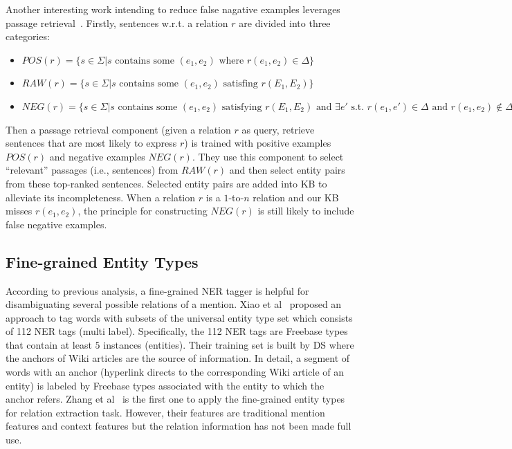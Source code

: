 \documentclass[10pt]{article} %
\theoremstyle{definition}
\theoremstyle{definition}
\begin{document}
Another interesting work intending to reduce false nagative examples leverages passage retrieval~\cite{passageretrieval}. 
Firstly, sentences w.r.t. a relation $r$ are divided into three categories: 
\begin{itemize}
\item $POS(r)=\{s\in\Sigma\vert{}s\text{ contains some }(e_1,e_2)\text{ where }r(e_1,e_2)\in\Delta\}$ 
\item $RAW(r)=\{s\in\Sigma\vert{}s\text{ contains some }(e_1,e_2)\text{ satisfing }r(E_1, E_2)\}$ 
\item $NEG(r)=\{s\in\Sigma\vert{}s\text{ contains some }(e_1,e_2)\text{ satisfying }r(E_1, E_2)\text{ and }\exists{}e'\text{ s.t. }r(e_1,e')\in\Delta\text{ and }r(e_1,e_2)\notin\Delta\}$ 
\end{itemize}
Then a passage retrieval component (given a relation $r$ as query, retrieve sentences that are most likely to express $r$) is trained with positive examples $POS(r)$ and negative examples $NEG(r)$. 
They use this component to select ``relevant'' passages (i.e., sentences) from $RAW(r)$ and then select entity pairs from these top-ranked sentences. 
Selected entity pairs are added into KB to alleviate its incompleteness. 
When a relation $r$ is a $1$-to-$n$ relation and our KB misses $r(e_1, e_2)$, the principle for constructing $NEG(r)$ is still likely to include false negative examples. 
\subsection{Fine-grained Entity Types}
According to previous analysis, a fine-grained NER tagger is helpful for disambiguating several possible relations of a mention. 
Xiao et al~\cite{112nertag} proposed an approach to tag words with subsets of the universal entity type set which consists of 112 NER tags (multi label). 
Specifically, the 112 NER tags are Freebase types that contain at least $5$ instances (entities). 
Their training set is built by DS where the anchors of Wiki articles are the source of information. 
In detail, a segment of words with an anchor (hyperlink directs to the corresponding Wiki article of an entity) is labeled by Freebase types associated with the entity to which the anchor refers. 
Zhang et al~\cite{xingxing} is the first one to apply the fine-grained entity types for relation extraction task. 
However, their features are traditional mention features and context features but the relation information has not been made full use. 
\end{document}
